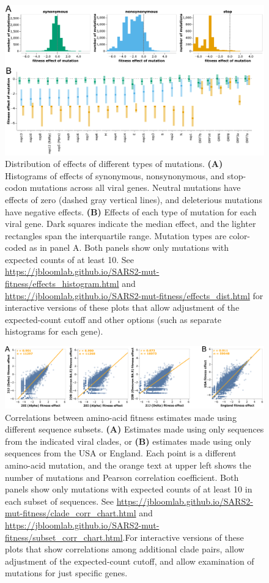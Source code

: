 \documentclass[9pt,twocolumn,twoside]{gsajnl_modified}
\begin{document}
\begin{figure}
\includegraphics[width=\linewidth]{figs/dist.pdf}
\caption{
Distribution of effects of different types of mutations.
{\bf (A)}
Histograms of effects of synonymous, nonsynonymous, and stop-codon mutations across all viral genes.
Neutral mutations have effects of zero (dashed gray vertical lines), and deleterious mutations have negative effects.
{\bf (B)}
Effects of each type of mutation for each viral gene.
Dark squares indicate the median effect, and the lighter rectangles span the interquartile range.
Mutation types are color-coded as in panel A.
Both panels show only mutations with expected counts of at least 10.
See \url{https://jbloomlab.github.io/SARS2-mut-fitness/effects_histogram.html} and \url{https://jbloomlab.github.io/SARS2-mut-fitness/effects_dist.html} for interactive versions of these plots that allow adjustment of the expected-count cutoff and other options (such as separate histograms for each gene).
\label{fig:dist}
}
\end{figure}

\begin{figure}
\centering
\includegraphics[width=\linewidth]{figs/corr.png}
\caption{
Correlations between amino-acid fitness estimates made using different sequence subsets.
{\bf (A)} Estimates made using only sequences from the indicated viral clades, or {\bf (B)} estimates made using only sequences from the USA or England.
Each point is a different amino-acid mutation, and the orange text at upper left shows the number of mutations and Pearson correlation coefficient.
Both panels show only mutations with expected counts of at least 10 in each subset of sequences.
See \url{https://jbloomlab.github.io/SARS2-mut-fitness/clade_corr_chart.html} and \url{https://jbloomlab.github.io/SARS2-mut-fitness/subset_corr_chart.html}.For interactive versions of these plots that show correlations among additional clade pairs, allow adjustment of the expected-count cutoff, and allow examination of mutations for just specific genes.
\label{fig:corr}
}
\end{figure}
\end{document}
